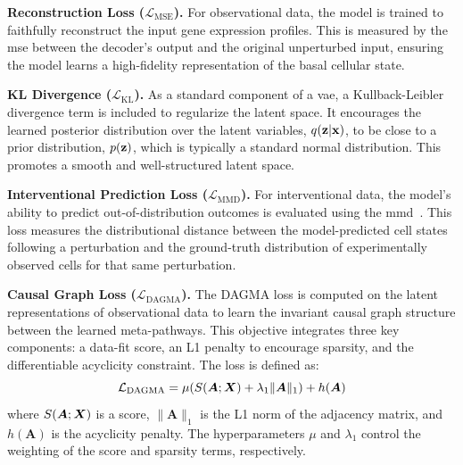 \documentclass[10pt,letterpaper]{article}
\def\mA{{\bm{A}}}\def\mB{{\bm{B}}}\def\mC{{\bm{C}}}
\theoremstyle{definition}
\theoremstyle{remark}
\newcommand{\variables}{\rvx}
\newcommand{\latentvars}{\rvz}
\newcommand{\datamatrix}{\mX}
\newcommand{\graphmatrix}{\mA}
\newcommand{\mseloss}{\mathcal{L}_{\text{MSE}}}
\newcommand{\kldloss}{\mathcal{L}_{\text{KL}}}
\newcommand{\mmdloss}{\mathcal{L}_{\text{MMD}}}
\newcommand{\dagmaloss}{\mathcal{L}_{\text{DAGMA}}}
\newcommand{\acyclicityfunc}{h}
\newcommand{\scorefunc}{S}
\begin{document}
\textbf{Reconstruction Loss ($\mseloss$).}
For observational data, the model is trained to faithfully reconstruct the input gene expression profiles.
This is measured by the \gls{mse} between the decoder's output and the original unperturbed input, ensuring the model learns a high-fidelity representation of the basal cellular state.

\textbf{KL Divergence ($\kldloss$).}
As a standard component of a \gls{vae}, a Kullback-Leibler divergence term is included to regularize the latent space.
It encourages the learned posterior distribution over the latent variables, $q(\latentvars|\variables)$, to be close to a prior distribution, $p(\latentvars)$, which is typically a standard normal distribution.
This promotes a smooth and well-structured latent space.

\textbf{Interventional Prediction Loss ($\mmdloss$).}
For interventional data, the model's ability to predict out-of-distribution outcomes is evaluated using the \gls{mmd}~\cite{gretton2012kernel}.
This loss measures the distributional distance between the model-predicted cell states following a perturbation and the ground-truth distribution of experimentally observed cells for that same perturbation.

\textbf{Causal Graph Loss ($\dagmaloss$).}
The DAGMA loss is computed on the latent representations of observational data to learn the invariant causal graph structure between the learned meta-pathways.
This objective integrates three key components: a data-fit score, an L1 penalty to encourage sparsity, and the differentiable acyclicity constraint.
The loss is defined as:
\begin{equation}
    \dagmaloss = \mu(\scorefunc(\graphmatrix; \datamatrix) + \lambda_1 \|\graphmatrix\|_1) + \acyclicityfunc(\graphmatrix)
    \label{eq:dagma_loss_full}
\end{equation}
where $\scorefunc(\graphmatrix; \datamatrix)$ is a score, $\|\graphmatrix\|_1$ is the L1 norm of the adjacency matrix, and $\acyclicityfunc(\graphmatrix)$ is the acyclicity penalty.
The hyperparameters $\mu$ and $\lambda_1$ control the weighting of the score and sparsity terms, respectively.
\end{document}
